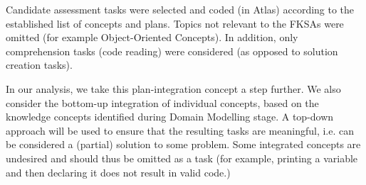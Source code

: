 

Candidate assessment tasks were selected and coded (in Atlas) according to the established list of concepts and plans. Topics not relevant to the FKSAs were omitted (for example Object-Oriented Concepts). In addition, only comprehension tasks (code reading) were considered (as opposed to solution creation tasks).



In our analysis, we take this plan-integration concept a step further. We also consider the bottom-up integration of individual concepts, based on the knowledge concepts identified during Domain Modelling stage. A top-down approach will be used to ensure that the resulting tasks are meaningful, i.e. can be considered a (partial) solution to some problem. Some integrated concepts are undesired and should thus be omitted as a task (for example, printing a variable and then declaring it does not result in valid code.)


